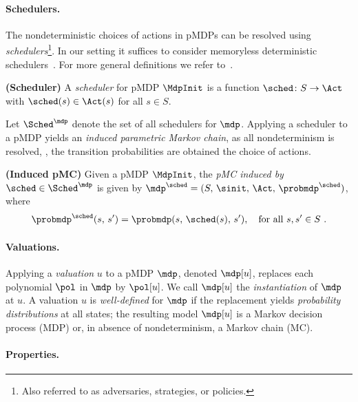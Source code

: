 \paragraph{Schedulers.}

The nondeterministic choices of actions in pMDPs can be resolved using \emph{schedulers}\footnote{Also referred to as adversaries, strategies, or policies.}.
In our setting it suffices to consider memoryless deterministic schedulers~\cite{Var85}. 
For more general definitions we refer to~\cite{BK08}.
\begin{definition}{\bf (Scheduler)}\label{def:scheduler}
	A \emph{scheduler} for pMDP $\MdpInit$ is a function $\sched\colon S\rightarrow\Act$ with $\sched(s)\in \Act(s)$ for all $s\in S$.  
\end{definition}
Let $\Sched^\mdp$ denote the set of all schedulers for $\mdp$.
Applying a scheduler to a pMDP yields an \emph{induced parametric Markov chain}, as all nondeterminism is resolved, \ie, the transition probabilities are obtained \wrt the choice of actions.
\begin{definition}{\bf (Induced pMC)}\label{def:induced_dtmc} 
	Given a pMDP $\MdpInit$, the \emph{pMC induced by $\sched\in\Sched^\mdp$} is given by $\mdp^\sched=(S,\, \sinit,\, \Act,\, \probmdp^\sched)$, where
	\begin{align*}
		\probmdp^\sched(s,\,s')= \probmdp(s,\, \sched(s),\, s'), \quad \mbox{for all } s,s'\in S~.
	\end{align*} 
\end{definition}



\paragraph{Valuations.}

Applying a \emph{valuation} $u$ to a pMDP $\mdp$, denoted $\mdp[u]$, replaces each polynomial $\pol$ in $\mdp$ by $\pol[u]$.
We call $\mdp[u]$ the \emph{instantiation} of $\mdp$ at $u$.
A valuation $u$ is \emph{well-defined} for $\mdp$ if the replacement yields \emph{probability distributions} at all states; the resulting model $\mdp[u]$ is a Markov decision process (MDP) or, in absence of nondeterminism, a Markov chain (MC).


\paragraph{Properties.}

